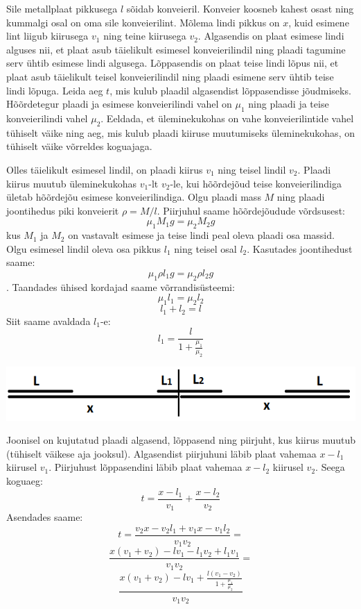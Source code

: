 \setAuthor{}

Sile metallplaat pikkusega $l$ sõidab konveieril. Konveier koosneb kahest osast ning kummalgi osal on oma sile konveierilint. Mõlema lindi pikkus on $x$, kuid esimene lint liigub kiirusega $v_1$ ning teine kiirusega $v_2$. Algasendis on plaat esimese lindi alguses nii, et plaat asub täielikult esimesel konveierilindil ning plaadi tagumine serv ühtib esimese lindi algusega. Lõppasendis on plaat teise lindi lõpus nii, et plaat asub täielikult teisel konveierilindil ning plaadi esimene serv ühtib teise lindi lõpuga. Leida aeg $t$, mis kulub plaadil algasendist lõppasendisse jõudmiseks. Hõõrdetegur plaadi ja esimese konveierilindi vahel on $\mu_{1}$ ning plaadi ja teise konveierilindi vahel $\mu_{2}$. Eeldada, et üleminekukohas on vahe konveierilintide vahel tühiselt väike ning aeg, mis kulub plaadi kiiruse muutumiseks üleminekukohas, on tühiselt väike võrreldes koguajaga. 



\hint

\solu
Olles täielikult esimesel lindil, on plaadi kiirus $v_1$ ning teisel lindil $v_2$. Plaadi kiirus muutub üleminekukohas $v_1$-lt $v_2$-le, kui hõõrdejõud teise konveierilindiga ületab hõõrdejõu esimese konveierilindiga. Olgu plaadi mass $M$ ning plaadi joontihedus piki konveierit $\rho = M/l$. Piirjuhul saame hõõrdejõudude võrdsusest:
$$\mu_{1}M_1g = \mu_{2}M_2g$$
kus $M_1$ ja $M_2$ on vastavalt esimese ja teise lindi peal oleva plaadi osa massid. Olgu esimesel lindil oleva osa pikkus $l_1$ ning teisel osal $l_2$. Kasutades joontihedust saame:
$$\mu_{1} \rho l_1 g = \mu_{2}\rho l_2 g$$.
Taandades ühised kordajad saame võrrandisüsteemi:
$$\mu_{1} l_1 = \mu_{2} l_2$$
$$l_1 + l_2 = l$$
Siit saame avaldada $l_1$-e:
$$l_1 = \frac{l}{1+\frac{\mu_{1}}{\mu_{2}}}$$

\begin{center}
\includegraphics[scale=0.5]{2019-v3g-04-yl.png}
\end{center}


Joonisel on kujutatud plaadi algasend, lõppasend ning piirjuht, kus kiirus muutub (tühiselt väikese aja jooksul). Algasendist piirjuhuni läbib plaat vahemaa $x - l_1$ kiirusel $v_1$. Piirjuhust lõppasendini läbib plaat vahemaa $x - l_2$ kiirusel $v_2$. Seega koguaeg:
$$t = \frac{x - l_1}{v_1} + \frac{x - l_2}{v_2}$$
Asendades saame:
$$t=\frac{v_2 x - v_2 l_1 + v_1 x - v_1 l_2}{v_1 v_2} =$$
$$\frac{x(v_1 + v_2) - lv_1 - l_1 v_2 + l_1 v_1}{v_1 v_2} =$$
$$\frac{x(v_1 + v_2) - lv_1 + \frac{l(v_1 - v_2)}{1+\frac{\mu_{1}}{\mu_{2}}}}{v_1 v_2}$$
\probend